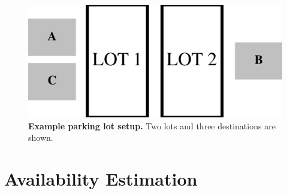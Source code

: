 \begin{figure}
\centering
\includegraphics[height=1.in]{./figures/CartoonLot.pdf}

\caption{\textbf{Example parking lot setup.} Two lots and three
destinations are shown.}

\label{fig-lots}
\end{figure}

\section{Availability Estimation}
\label{sec-model}

